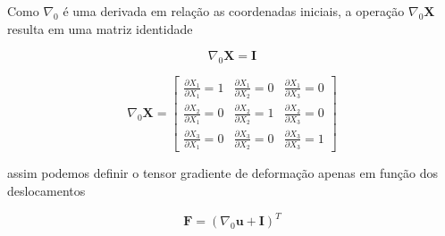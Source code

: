 Como $\nabla_0$ é uma derivada em relação as coordenadas iniciais, a operação $\nabla_0 \mathbf{X}$ resulta em uma matriz identidade

\begin{equation}
	\nabla_0 \mathbf{X} = \mathbf{I}
\end{equation}

\begin{equation}
	\nabla_0 \mathbf{X} = 
	\left[\begin{array}{ccc}
		\frac{\partial X_1}{\partial X_1}  = 1
		& \frac{\partial X_1}{\partial X_2} = 0
		& \frac{\partial X_1}{\partial X_3} = 0
		\\
		\frac{\partial X_2}{\partial X_1}  = 0
		& \frac{\partial X_2}{\partial X_2} = 1
		& \frac{\partial X_2}{\partial X_3} = 0
		\\
		\frac{\partial X_3}{\partial X_1} = 0
		& \frac{\partial X_3}{\partial X_2} = 0
		& \frac{\partial X_3}{\partial X_3} = 1
	\end{array}\right]
\end{equation}

assim podemos definir o tensor gradiente de deformação apenas em função dos deslocamentos

\begin{equation}
	\mathbf{F} = (\nabla_0 \mathbf{u} + \mathbf{I})^T
\end{equation}

